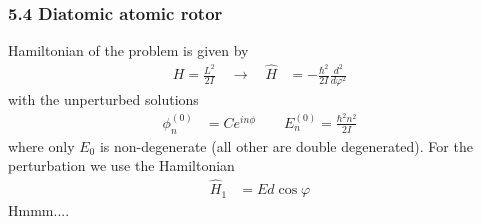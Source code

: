 \documentclass[10pt,a4paper]{book}
\theoremstyle{definition}
\begin{document}
\subsubsection{5.4 Diatomic atomic rotor}
Hamiltonian of the problem is given by
\begin{align}
H=\frac{L^2}{2I}\quad\rightarrow\quad\hat{H}&=-\frac{\hbar^2}{2I}\frac{d^2}{d\varphi^2}
\end{align}
with the unperturbed solutions
\begin{align}
\phi_n^{(0)}&=C e^{in\phi}\qquad E_n^{(0)}=\frac{\hbar^2n^2}{2I}
\end{align}
where only $E_0$  is non-degenerate (all other are double degenerated). 
For the perturbation we use the Hamiltonian
\begin{align}
\hat{H}_1&=Ed\cos\varphi
\end{align}
Hmmm....
\end{document}
